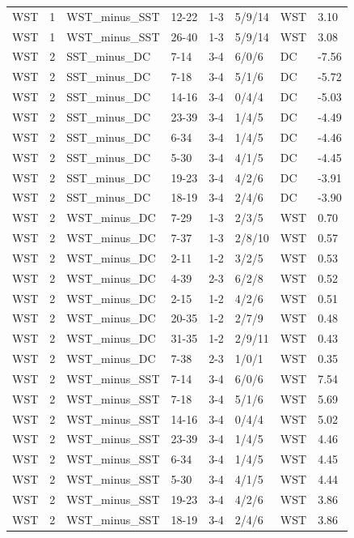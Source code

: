 \begin{table}[!h]
\begin{tabular}[t]{lrllllll}
WST & 1 & WST_minus_SST & 12-22 & 1-3 & 5/9/14 & WST & 3.10\\
WST & 1 & WST_minus_SST & 26-40 & 1-3 & 5/9/14 & WST & 3.08\\
WST & 2 & SST_minus_DC & 7-14 & 3-4 & 6/0/6 & DC & -7.56\\
\addlinespace
WST & 2 & SST_minus_DC & 7-18 & 3-4 & 5/1/6 & DC & -5.72\\
WST & 2 & SST_minus_DC & 14-16 & 3-4 & 0/4/4 & DC & -5.03\\
WST & 2 & SST_minus_DC & 23-39 & 3-4 & 1/4/5 & DC & -4.49\\
WST & 2 & SST_minus_DC & 6-34 & 3-4 & 1/4/5 & DC & -4.46\\
WST & 2 & SST_minus_DC & 5-30 & 3-4 & 4/1/5 & DC & -4.45\\
\addlinespace
WST & 2 & SST_minus_DC & 19-23 & 3-4 & 4/2/6 & DC & -3.91\\
WST & 2 & SST_minus_DC & 18-19 & 3-4 & 2/4/6 & DC & -3.90\\
WST & 2 & WST_minus_DC & 7-29 & 1-3 & 2/3/5 & WST & 0.70\\
WST & 2 & WST_minus_DC & 7-37 & 1-3 & 2/8/10 & WST & 0.57\\
WST & 2 & WST_minus_DC & 2-11 & 1-2 & 3/2/5 & WST & 0.53\\
\addlinespace
WST & 2 & WST_minus_DC & 4-39 & 2-3 & 6/2/8 & WST & 0.52\\
WST & 2 & WST_minus_DC & 2-15 & 1-2 & 4/2/6 & WST & 0.51\\
WST & 2 & WST_minus_DC & 20-35 & 1-2 & 2/7/9 & WST & 0.48\\
WST & 2 & WST_minus_DC & 31-35 & 1-2 & 2/9/11 & WST & 0.43\\
WST & 2 & WST_minus_DC & 7-38 & 2-3 & 1/0/1 & WST & 0.35\\
\addlinespace
WST & 2 & WST_minus_SST & 7-14 & 3-4 & 6/0/6 & WST & 7.54\\
WST & 2 & WST_minus_SST & 7-18 & 3-4 & 5/1/6 & WST & 5.69\\
WST & 2 & WST_minus_SST & 14-16 & 3-4 & 0/4/4 & WST & 5.02\\
WST & 2 & WST_minus_SST & 23-39 & 3-4 & 1/4/5 & WST & 4.46\\
WST & 2 & WST_minus_SST & 6-34 & 3-4 & 1/4/5 & WST & 4.45\\
\addlinespace
WST & 2 & WST_minus_SST & 5-30 & 3-4 & 4/1/5 & WST & 4.44\\
WST & 2 & WST_minus_SST & 19-23 & 3-4 & 4/2/6 & WST & 3.86\\
WST & 2 & WST_minus_SST & 18-19 & 3-4 & 2/4/6 & WST & 3.86\\
\bottomrule
\end{tabular}
\end{table}
